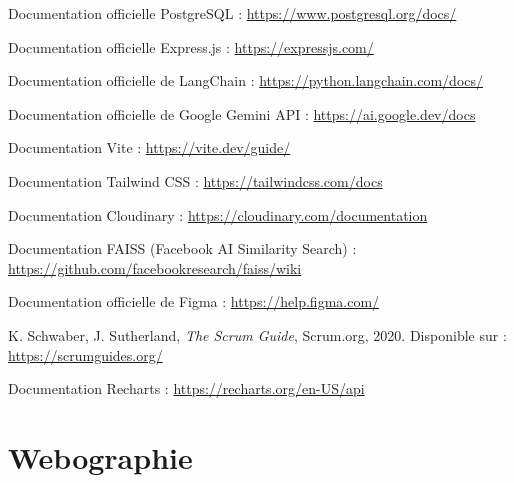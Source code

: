 \begin{enumerate}[label={[\arabic*]},series=refs]
    \item Documentation officielle PostgreSQL : \url{https://www.postgresql.org/docs/}

    \item Documentation officielle Express.js : \url{https://expressjs.com/}

    \item Documentation officielle de LangChain : \url{https://python.langchain.com/docs/}

    \item Documentation officielle de Google Gemini API : \url{https://ai.google.dev/docs}

    \item Documentation Vite : \url{https://vite.dev/guide/}

    \item Documentation Tailwind CSS : \url{https://tailwindcss.com/docs}

    \item Documentation Cloudinary : \url{https://cloudinary.com/documentation}

    \item Documentation FAISS (Facebook AI Similarity Search) : \url{https://github.com/facebookresearch/faiss/wiki}

    \item Documentation officielle de Figma : \url{https://help.figma.com/}

    \item K. Schwaber, J. Sutherland, \textit{The Scrum Guide}, Scrum.org, 2020. Disponible sur : \url{https://scrumguides.org/}

    \item Documentation Recharts : \url{https://recharts.org/en-US/api}

\end{enumerate}

\vspace{1cm}

\chapter*{Webographie}

